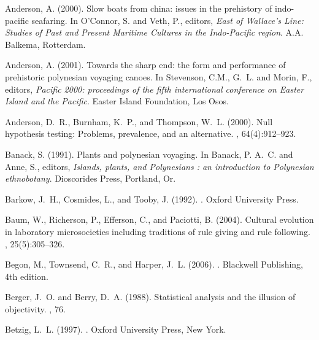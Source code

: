 
Anderson, A. (2000).
\newblock Slow boats from china: issues in the prehistory of indo-pacific
  seafaring.
\newblock In O'Connor, S. and Veth, P., editors, {\em East of Wallace's Line:
  Studies of Past and Present Maritime Cultures in the Indo-Pacific region}.
  A.A. Balkema, Rotterdam.

Anderson, A. (2001).
\newblock Towards the sharp end: the form and performance of prehistoric
  polynesian voyaging canoes.
\newblock In Stevenson, C.M., G.~L. and Morin, F., editors, {\em Pacific 2000:
  proceedings of the fifth international conference on Easter Island and the
  Pacific}. Easter Island Foundation, Los Osos.

Anderson, D.~R., Burnham, K.~P., and Thompson, W.~L. (2000).
\newblock Null hypothesis testing: Problems, prevalence, and an alternative.
, 64(4):912--923.

Banack, S. (1991).
\newblock Plants and polynesian voyaging.
\newblock In Banack, P. A.~C. and Anne, S., editors, {\em Islands, plants, and
  Polynesians : an introduction to Polynesian ethnobotany}. Dioscorides Press,
  Portland, Or.

Barkow, J.~H., Cosmides, L., and Tooby, J. (1992).
.
\newblock Oxford University Press.

Baum, W., Richerson, P., Efferson, C., and Paciotti, B. (2004).
\newblock Cultural evolution in laboratory microsocieties including traditions
  of rule giving and rule following.
, 25(5):305--326.

Begon, M., Townsend, C.~R., and Harper, J.~L. (2006).
.
\newblock Blackwell Publishing, 4th edition.

Berger, J.~O. and Berry, D.~A. (1988).
\newblock Statistical analysis and the illusion of objectivity.
, 76.

Betzig, L.~L. (1997).
.
\newblock Oxford University Press, New York.

